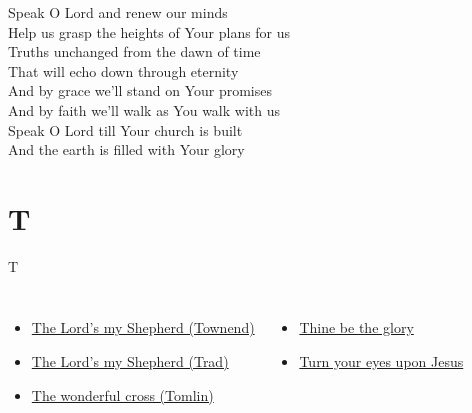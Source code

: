 \documentclass{beamer}
\begin{document}
{\begin{frame}{}
\end{frame}

\hypertarget{Speak O Lord[](Getty/Townend)3}{}
\begin{frame}{}
\fontsize{ 15 }{ 19 }\selectfont

Speak O Lord and renew our minds\\ 
Help us grasp the heights of Your plans for us\\ 
Truths unchanged from the dawn of time\\ 
That will echo down through eternity\\ 
And by grace we'll stand on Your promises\\ 
And by faith we'll walk as You walk with us\\ 
Speak O Lord till Your church is built\\ 
And the earth is filled with Your glory 

\end{frame}

}
\section{T}

\begin{frame}{T}
\begin{columns}
    \begin{itemize}
    \item \hyperlink{The Lord's my Shepherd['Psalm 23'](Townend)1}{The Lord's my Shepherd (Townend)}
    \item \hyperlink{The Lord's my Shepherd['Psalm 23'](Trad)1}{The Lord's my Shepherd (Trad)}
    \item \hyperlink{The wonderful cross['When I survey'](Tomlin)1}{The wonderful cross (Tomlin)}
\end{itemize}
    \begin{itemize}
    \item \hyperlink{Thine be the glory[]1}{Thine be the glory }
    \item \hyperlink{Turn your eyes upon Jesus[]1}{Turn your eyes upon Jesus }
\end{itemize}


\end{columns}

\end{frame}
\end{document}
